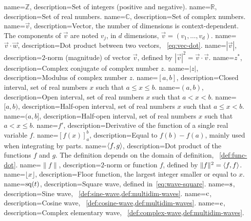 {
  name={$\mathbb{Z}$},
  description={Set of integers (positive and negative).}
}
{
  name={$\mathbb{R}$},
  description={Set of real numbers.}
}
{
  name={$\mathbb{C}$},
  description={Set of complex numbers.}
}
{
  name={$\vec{v}$},
  description={Vector, the number of dimensions is context-dependent. The components of $\vec{v}$ are noted $v_j$, \ie in $d$ dimensions, $\vec{v}=(v_1,\dots,v_d)$.}
}
{
  name={$\vec{v}\cdot\vec{w}$},
  description={Dot product between two vectors, \cf~\cref{eq:vec-dot}.}
}
{
  name={$|\vec{v}|$},
  description={$2$-norm (magnitude) of vector $\vec{v}$, defined by $|\vec{v}|^2=\vec{v}\cdot\vec{v}$.}
}
{
  name={$z^*$},
  description={Complex conjugate of complex number $z$.}
}
{
  name={$|z|$},
  description={Modulus of complex number $z$.}
}
{
  name={$[a,b]$},
  description={Closed interval, \ie set of real numbers $x$ such that $a\leq x \leq b$.}
}
{
  name={$(a,b)$},
  description={Open interval, \ie set of real numbers $x$ such that $a< x <b$.}
}
{
  name={$[a,b)$},
  description={Half-open interval, \ie set of real numbers $x$ such that $a\leq x <b$.}
}
{
  name={$(a,b]$},
  description={Half-open interval, \ie set of real numbers $x$ such that $a< x\leq b$.}
}
{
  name={$f'$},
  description={Derivative of the function of a single real variable $f$.}
}
{
  name={$\left[f(x)\right]_a^b$},
  description={Equal to $f(b)-f(a)$, mainly used when integrating by parts.}
}
{
  name={$\braket{f,g}$},
  description={Dot product of the functions $f$ and $g$. The definition depends on the domain of definition, \cf~\cref{def:func-dot}.}
}
{
  name={$\|f\|$},
  description={$2$-norm or function $f$, defined by $\|f\|^2=\braket{f,f}$.}
}
{
  name={$\lfloor x\rfloor$},
  description={Floor function, \ie the largest integer smaller or equal to $x$.}
}
{
  name={$\operatorname{sq}(t)$},
  description={Square wave, defined in~\cref{eq:wave-square}.}
}
{
  name={$\operatorname{s}$},
  description={Sine wave, \cf~\cref{def:sine-wave,def:multidim-waves}.}
}
{
  name={$\operatorname{c}$},
  description={Cosine wave, \cf~\cref{def:cosine-wave,def:multidim-waves}.}
}
{
  name={$\operatorname{e}$},
  description={Complex elementary wave, \cf~\cref{def:complex-wave,def:multidim-waves}.}
}
\makeglossaries

